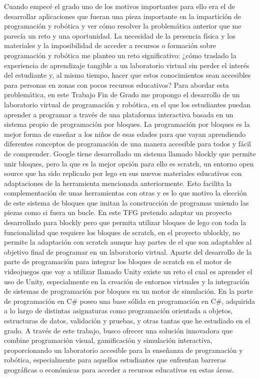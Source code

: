 Cuando empecé el grado uno de los motivos importantes para ello era el de desarrollar aplicaciones que fueran una pieza importante en la impartición de programación y robótica y ver cómo resolver la problemática anterior que me parecía un reto y una oportunidad.
La necesidad de la presencia física y los materiales y la imposibilidad de acceder a recursos o formación sobre programación y robótica me planteo un reto significativo: ¿cómo traslado la experiencia de aprendizaje tangible a un laboratorio virtual sin perder el interés del estudiante y, al mismo tiempo, hacer que estos conocimientos sean accesibles para personas en zonas con pocos recursos educativos? Para abordar esta problemática, en este Trabajo Fin de Grado me propongo el desarrollo de un laboratorio virtual de programación y robótica, en el que los estudiantes puedan aprender a programar a través de una plataforma interactiva basada en un sistema propio de programación por bloques.
La programación por bloques es la mejor forma de enseñar a los niños de esas edades para que vayan aprendiendo diferentes conceptos de programación de una manera accesible para todos y fácil de comprender. 
Google tiene desarrollado un sistema llamado blockly que permite unir bloques, pero la que es la mejor opción para ello es scratch, un entorno open source que ha sido replicado por lego en sus nuevos materiales educativos con adaptaciones de la herramienta mencionada anteriormente. Esto facilita la complementación de unas herramientas con otras y es lo que motivo la elección de este sistema de bloques que imitan la construcción de programas uniendo las piezas como si fuera un bucle.
En este TFG pretendo adaptar un proyecto desarrollado para blockly pero que permita utilizar bloques de lego con toda la funcionalidad que requiere los bloques de scratch, en el proyecto ublockly, no permite la adaptación con scratch aunque hay partes de el que son adaptables al objetivo final de programar en un laboratorio virtual.
Aparte del desarrollo de la parte de programación para integrar los bloques de scratch en el motor de videojuegos que voy a utilizar llamado Unity existe un reto el cual es aprender el uso de Unity, especialmente en la creación de entornos virtuales y la integración de sistemas de programación por bloques en un motor de simulación. En la parte de programación en C# poseo una base sólida en programación en C#, adquirida a lo largo de distintas asignaturas como programación orientada a objetos, estructuras de datos, validación y pruebas, y otras tantas que he estudiado en el grado.
A través de este trabajo, busco ofrecer una solución innovadora que combine programación visual, gamificación y simulación interactiva, proporcionando un laboratorio accesible para la enseñanza de programación y robótica, especialmente para aquellos estudiantes que enfrentan barreras geográficas o económicas para acceder a recursos educativos en estas áreas.

